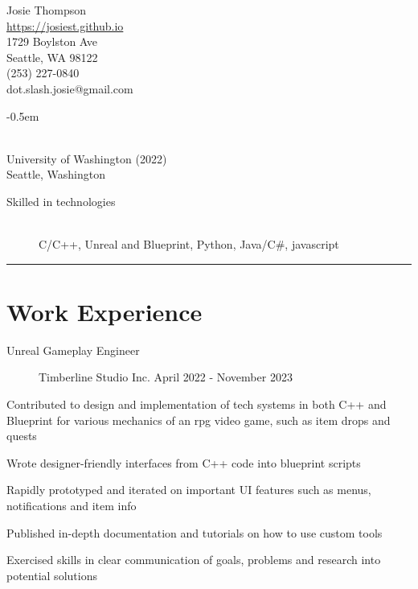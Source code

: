 \documentclass[10pt]{article}
\newenvironment{itemize*}
{\begin{itemize}[leftmargin=*]
    \setlength{\parskip}{0.5pt}}
{\end{itemize}}
\begin{document}
\begin{paracol}{2}
\noindent
\parbox[t]{0.5\textwidth}{
    {\sffamily\Huge Josie Thompson}\medskip\\
    \url{https://josiest.github.io}\\
    1729 Boylston Ave\\
    Seattle, WA 98122\\
    (253) 227-0840\\
    dot.slash.josie@gmail.com
}
\switchcolumn

\begin{description}
\itemsep -0.5em
\item[B.S. in Computer Science] \hfill \\
    University of Washington (2022)\\
    Seattle, Washington
\end{description}

\begin{description}
\item[Skilled in technologies] \hfill \\
C/C++, Unreal and Blueprint, Python, Java/C\#, javascript
\end{description}

\end{paracol}
\vspace{12pt}
\hrule

\section*{Work Experience}

\begin{description}
\item[Unreal Gameplay Engineer] Timberline Studio Inc.
    \hfill April 2022 - November 2023
\end{description}
\begin{itemize*}
\item Contributed to design and implementation of tech systems in both C++ and
      Blueprint for various mechanics of an rpg video game, such as item drops
      and quests
\item Wrote designer-friendly interfaces from C++ code into blueprint scripts
\item Rapidly prototyped and iterated on important UI features such as menus,
      notifications and item info
\item Published in-depth documentation and tutorials on how to use custom tools
\item Exercised skills in clear communication of goals, problems and research
      into potential solutions
\end{itemize*}
\vspace{10pt}
\end{document}

